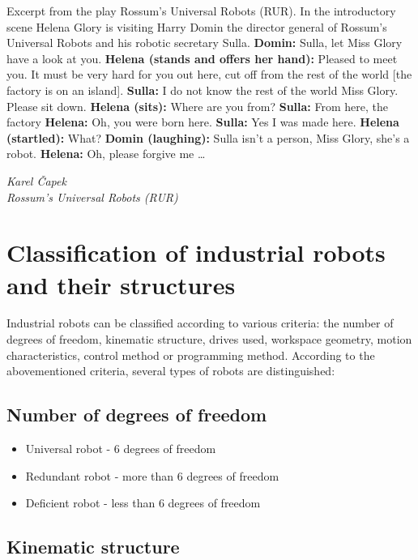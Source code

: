 \epigraph{

Excerpt from the play Rossum’s Universal Robots (RUR).\break
In the introductory scene Helena Glory is visiting Harry Domin the director general of Rossum’s Universal Robots and his robotic secretary Sulla.\break
\break
\textbf{Domin:} Sulla, let Miss Glory have a look at you.\break
\textbf{Helena (stands and offers her hand):} Pleased to meet you. It must be very hard for you out here, cut off from the rest of the world [the factory is on an island].\break
\textbf{Sulla:} I do not know the rest of the world Miss Glory. Please sit down.\break
\textbf{Helena (sits):} Where are you from?\break
\textbf{Sulla:} From here, the factory\break
\textbf{Helena:} Oh, you were born here.\break
\textbf{Sulla:} Yes I was made here.\break
\textbf{Helena (startled):} What?\break
\textbf{Domin (laughing):} Sulla isn’t a person, Miss Glory, she’s a robot.\break
\textbf{Helena:} Oh, please forgive me …
}{\textit{Karel Čapek \\ Rossum’s Universal Robots (RUR)}}

\section{Classification of industrial robots and their structures}

Industrial robots can be classified according to various criteria: the number of degrees of freedom, kinematic structure, drives used, workspace geometry, motion characteristics, control method or programming method. According to the abovementioned criteria, several types of robots are distinguished:

\subsection*{Number of degrees of freedom}

\begin{itemize}
    \item Universal robot - 6 degrees of freedom
    \item Redundant robot - more than 6 degrees of freedom
    \item Deficient robot - less than 6 degrees of freedom
\end{itemize}

\subsection*{Kinematic structure}

